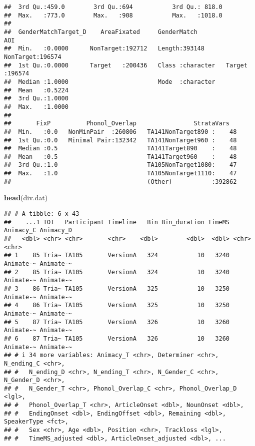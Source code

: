 \documentclass[
]{article}
\newenvironment{Shaded}{\begin{snugshade}}{\end{snugshade}}
\newcommand{\FunctionTok}[1]{\textcolor[rgb]{0.13,0.29,0.53}{\textbf{#1}}}
\newcommand{\NormalTok}[1]{#1}
\begin{document}
\begin{verbatim}
##  3rd Qu.:459.0        3rd Qu.:694           3rd Qu.: 818.0    
##  Max.   :773.0        Max.   :908           Max.   :1018.0    
##                                                               
##  GenderMatchTarget_D    AreaFixated     GenderMatch               AOI        
##  Min.   :0.0000      NonTarget:192712   Length:393148      NonTarget:196574  
##  1st Qu.:0.0000      Target   :200436   Class :character   Target   :196574  
##  Median :1.0000                         Mode  :character                     
##  Mean   :0.5224                                                              
##  3rd Qu.:1.0000                                                              
##  Max.   :1.0000                                                              
##                                                                              
##       FixP          Phonol_Overlap                StrataVars    
##  Min.   :0.0   NonMinPair  :260806   TA141NonTarget890 :    48  
##  1st Qu.:0.0   Minimal Pair:132342   TA141NonTarget960 :    48  
##  Median :0.5                         TA141Target890    :    48  
##  Mean   :0.5                         TA141Target960    :    48  
##  3rd Qu.:1.0                         TA105NonTarget1080:    47  
##  Max.   :1.0                         TA105NonTarget1110:    47  
##                                      (Other)           :392862
\end{verbatim}

\begin{Shaded}
\begin{Highlighting}[]
\FunctionTok{head}\NormalTok{(div.dat)}
\end{Highlighting}
\end{Shaded}

\begin{verbatim}
## # A tibble: 6 x 43
##    ...1 TOI   Participant Timeline   Bin Bin_duration TimeMS Animacy_C Animacy_D
##   <dbl> <chr> <chr>       <chr>    <dbl>        <dbl>  <dbl> <chr>     <chr>    
## 1    85 Tria~ TA105       VersionA   324           10   3240 Animate-~ Animate-~
## 2    85 Tria~ TA105       VersionA   324           10   3240 Animate-~ Animate-~
## 3    86 Tria~ TA105       VersionA   325           10   3250 Animate-~ Animate-~
## 4    86 Tria~ TA105       VersionA   325           10   3250 Animate-~ Animate-~
## 5    87 Tria~ TA105       VersionA   326           10   3260 Animate-~ Animate-~
## 6    87 Tria~ TA105       VersionA   326           10   3260 Animate-~ Animate-~
## # i 34 more variables: Animacy_T <chr>, Determiner <chr>, N_ending_C <chr>,
## #   N_ending_D <chr>, N_ending_T <chr>, N_Gender_C <chr>, N_Gender_D <chr>,
## #   N_Gender_T <chr>, Phonol_Overlap_C <chr>, Phonol_Overlap_D <lgl>,
## #   Phonol_Overlap_T <chr>, ArticleOnset <dbl>, NounOnset <dbl>,
## #   EndingOnset <dbl>, EndingOffset <dbl>, Remaining <dbl>, SpeakerType <fct>,
## #   Sex <chr>, Age <dbl>, Position <chr>, Trackloss <lgl>,
## #   TimeMS_adjusted <dbl>, ArticleOnset_adjusted <dbl>, ...
\end{verbatim}
\end{document}
